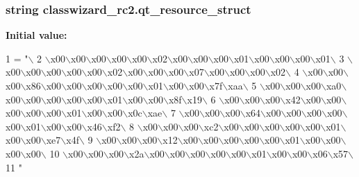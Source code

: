 \subsubsection[{qt\+\_\+resource\+\_\+struct}]{\setlength{\rightskip}{0pt plus 5cm}string classwizard\+\_\+rc2.\+qt\+\_\+resource\+\_\+struct}\label{namespaceclasswizard__rc2_a76e3cf54cd6622acdb54f74ee032cd7d}
{\bfseries Initial value\+:}
\begin{DoxyCode}
1 = \textcolor{stringliteral}{"\(\backslash\)}
2 \textcolor{stringliteral}{\(\backslash\)x00\(\backslash\)x00\(\backslash\)x00\(\backslash\)x00\(\backslash\)x00\(\backslash\)x02\(\backslash\)x00\(\backslash\)x00\(\backslash\)x00\(\backslash\)x01\(\backslash\)x00\(\backslash\)x00\(\backslash\)x00\(\backslash\)x01\(\backslash\)}
3 \textcolor{stringliteral}{\(\backslash\)x00\(\backslash\)x00\(\backslash\)x00\(\backslash\)x00\(\backslash\)x00\(\backslash\)x02\(\backslash\)x00\(\backslash\)x00\(\backslash\)x00\(\backslash\)x07\(\backslash\)x00\(\backslash\)x00\(\backslash\)x00\(\backslash\)x02\(\backslash\)}
4 \textcolor{stringliteral}{\(\backslash\)x00\(\backslash\)x00\(\backslash\)x00\(\backslash\)x86\(\backslash\)x00\(\backslash\)x00\(\backslash\)x00\(\backslash\)x00\(\backslash\)x00\(\backslash\)x01\(\backslash\)x00\(\backslash\)x00\(\backslash\)x7f\(\backslash\)xaa\(\backslash\)}
5 \textcolor{stringliteral}{\(\backslash\)x00\(\backslash\)x00\(\backslash\)x00\(\backslash\)xa0\(\backslash\)x00\(\backslash\)x00\(\backslash\)x00\(\backslash\)x00\(\backslash\)x00\(\backslash\)x01\(\backslash\)x00\(\backslash\)x00\(\backslash\)x8f\(\backslash\)x19\(\backslash\)}
6 \textcolor{stringliteral}{\(\backslash\)x00\(\backslash\)x00\(\backslash\)x00\(\backslash\)x42\(\backslash\)x00\(\backslash\)x00\(\backslash\)x00\(\backslash\)x00\(\backslash\)x00\(\backslash\)x01\(\backslash\)x00\(\backslash\)x00\(\backslash\)x0c\(\backslash\)xae\(\backslash\)}
7 \textcolor{stringliteral}{\(\backslash\)x00\(\backslash\)x00\(\backslash\)x00\(\backslash\)x64\(\backslash\)x00\(\backslash\)x00\(\backslash\)x00\(\backslash\)x00\(\backslash\)x00\(\backslash\)x01\(\backslash\)x00\(\backslash\)x00\(\backslash\)x46\(\backslash\)xf2\(\backslash\)}
8 \textcolor{stringliteral}{\(\backslash\)x00\(\backslash\)x00\(\backslash\)x00\(\backslash\)xc2\(\backslash\)x00\(\backslash\)x00\(\backslash\)x00\(\backslash\)x00\(\backslash\)x00\(\backslash\)x01\(\backslash\)x00\(\backslash\)x00\(\backslash\)xe7\(\backslash\)x4f\(\backslash\)}
9 \textcolor{stringliteral}{\(\backslash\)x00\(\backslash\)x00\(\backslash\)x00\(\backslash\)x12\(\backslash\)x00\(\backslash\)x00\(\backslash\)x00\(\backslash\)x00\(\backslash\)x00\(\backslash\)x01\(\backslash\)x00\(\backslash\)x00\(\backslash\)x00\(\backslash\)x00\(\backslash\)}
10 \textcolor{stringliteral}{\(\backslash\)x00\(\backslash\)x00\(\backslash\)x00\(\backslash\)x2a\(\backslash\)x00\(\backslash\)x00\(\backslash\)x00\(\backslash\)x00\(\backslash\)x00\(\backslash\)x01\(\backslash\)x00\(\backslash\)x00\(\backslash\)x06\(\backslash\)x57\(\backslash\)}
11 \textcolor{stringliteral}{"}
\end{DoxyCode}
